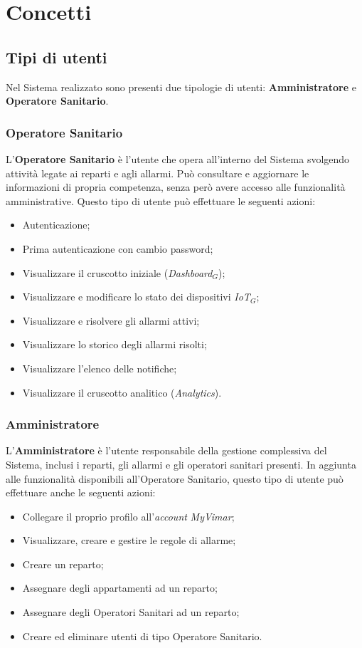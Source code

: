 \documentclass[10pt, letterpaper]{article}
\newcommand{\os}{Operatore Sanitario\xspace}
\newcommand{\admin}{Amministratore\xspace}
\begin{document}
\section{Concetti}

\subsection{Tipi di utenti}
Nel Sistema realizzato sono presenti due tipologie di utenti: \textbf{\admin} e \textbf{\os}.

\subsubsection{Operatore Sanitario}
L'\textbf{\os} è l'utente che opera all'interno del Sistema svolgendo attività legate ai reparti e agli allarmi. Può consultare e aggiornare le informazioni di propria competenza, senza però avere accesso alle funzionalità amministrative.
Questo tipo di utente può effettuare le seguenti azioni:
\begin{itemize}
    \item Autenticazione;
    \item Prima autenticazione con cambio password;
    \item Visualizzare il cruscotto iniziale (\textit{Dashboard}${_G}$);
    \item Visualizzare e modificare lo stato dei dispositivi \textit{IoT}${_G}$;
    \item Visualizzare e risolvere gli allarmi attivi;
    \item Visualizzare lo storico degli allarmi risolti;
    \item Visualizzare l'elenco delle notifiche;
    \item Visualizzare il cruscotto analitico (\textit{Analytics}).
\end{itemize}

\subsubsection{Amministratore}
L'\textbf{\admin} è l'utente responsabile della gestione complessiva del Sistema, inclusi i reparti, gli allarmi e gli operatori sanitari presenti.
In aggiunta alle funzionalità disponibili all'\os, questo tipo di utente può effettuare anche le seguenti azioni:
\begin{itemize}
    \item Collegare il proprio profilo all'\textit{account} \textit{MyVimar};
    \item Visualizzare, creare e gestire le regole di allarme;
    \item Creare un reparto;
    \item Assegnare degli appartamenti ad un reparto;
    \item Assegnare degli Operatori Sanitari ad un reparto;
    \item Creare ed eliminare utenti di tipo \os.
\end{itemize}
\end{document}
